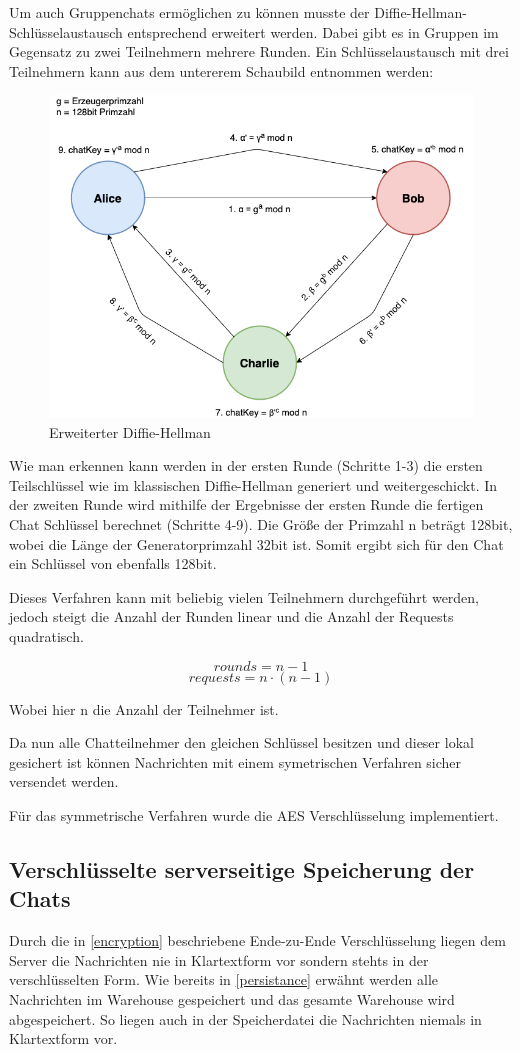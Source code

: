 Um auch Gruppenchats ermöglichen zu können musste der 
Diffie-Hellman- Schlüsselaustausch entsprechend erweitert werden.
Dabei gibt es in Gruppen im Gegensatz zu zwei Teilnehmern 
mehrere Runden. Ein Schlüsselaustausch mit drei Teilnehmern kann
aus dem untererem Schaubild entnommen werden:

\begin{figure}[h]
  \centering
  \includegraphics[width=\textwidth]{dh.png}
  
  \caption{Erweiterter Diffie-Hellman}
  \label{}
\end{figure}

Wie man erkennen kann werden in der ersten Runde (Schritte 1-3)
die ersten Teilschlüssel wie im klassischen Diffie-Hellman generiert
und weitergeschickt. In der zweiten Runde wird mithilfe der Ergebnisse
der ersten Runde die fertigen Chat Schlüssel berechnet (Schritte 4-9).
Die Größe der Primzahl n beträgt 128bit, wobei die Länge der
Generatorprimzahl 32bit ist. Somit ergibt sich für den Chat ein 
Schlüssel von ebenfalls 128bit.

Dieses Verfahren kann mit beliebig vielen Teilnehmern durchgeführt
werden, jedoch steigt die Anzahl der Runden linear und die Anzahl der 
Requests quadratisch.

$$ rounds = n - 1 $$
$$ requests = n \cdot (n - 1) $$

Wobei hier n die Anzahl der Teilnehmer ist.

Da nun alle Chatteilnehmer den gleichen Schlüssel besitzen und dieser 
lokal gesichert ist können Nachrichten mit einem symetrischen Verfahren
sicher versendet werden.

Für das symmetrische Verfahren wurde die AES Verschlüsselung implementiert.

\author{Troy Keßler}
\subsection{Verschlüsselte serverseitige Speicherung der Chats}
Durch die in \ref{encryption} beschriebene Ende-zu-Ende Verschlüsselung liegen dem Server die Nachrichten nie in Klartextform vor sondern stehts in der verschlüsselten Form. Wie bereits in \ref{persistance} erwähnt werden alle Nachrichten im Warehouse gespeichert und das gesamte Warehouse wird abgespeichert. So liegen auch in der Speicherdatei die Nachrichten niemals in Klartextform vor.

